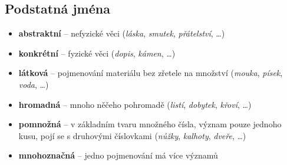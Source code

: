 \subsection{Podstatná jména}
\begin{itemize}
\item \textbf{abstraktní} -- nefyzické věci (\textit{láska}, \textit{smutek}, \textit{přátelství}, \ldots)
\item \textbf{konkrétní} -- fyzické věci (\textit{dopis}, \textit{kámen}, \ldots)
\item \textbf{látková} -- pojmenování materiálu bez zřetele na množství (\textit{mouka}, \textit{písek}, \textit{voda}, \ldots)
\item \textbf{hromadná} -- mnoho něčeho pohromadě (\textit{listí}, \textit{dobytek}, \textit{křoví}, \ldots)
\item \textbf{pomnožná} -- v základním tvaru množného čísla, význam pouze jednoho kusu, pojí se s druhovými číslovkami (\textit{nůžky}, \textit{kalhoty}, \textit{dveře}, \ldots)
\item \textbf{mnohoznačná} -- jedno pojmenování má více významů
\end{itemize}

